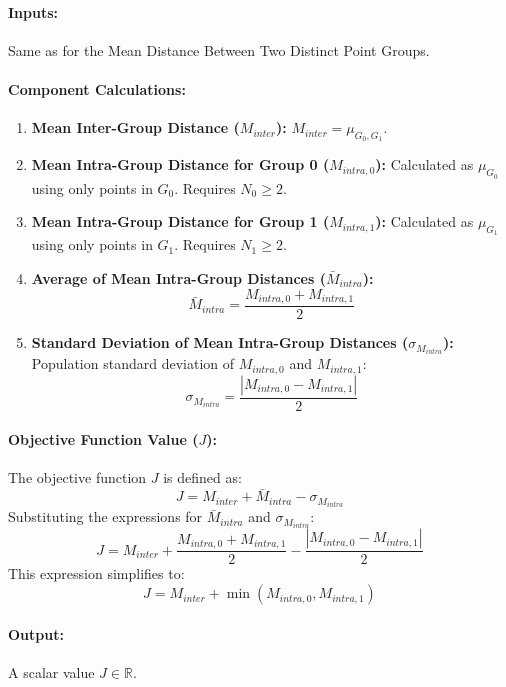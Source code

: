 \documentclass{article}
\begin{document}
\paragraph{Inputs:}
Same as for the Mean Distance Between Two Distinct Point Groups.

\paragraph{Component Calculations:}
\begin{enumerate}
    \item \textbf{Mean Inter-Group Distance ($M_{inter}$):}
    $M_{inter} = \mu_{G_0,G_1}$.

    \item \textbf{Mean Intra-Group Distance for Group 0 ($M_{intra,0}$):}
    Calculated as $\mu_{G_0}$ using only points in $G_0$. Requires $N_0 \ge 2$.

    \item \textbf{Mean Intra-Group Distance for Group 1 ($M_{intra,1}$):}
    Calculated as $\mu_{G_1}$ using only points in $G_1$. Requires $N_1 \ge 2$.

    \item \textbf{Average of Mean Intra-Group Distances ($\bar{M}_{intra}$):}
    $$ \bar{M}_{intra} = \frac{M_{intra,0} + M_{intra,1}}{2} $$

    \item \textbf{Standard Deviation of Mean Intra-Group Distances ($\sigma_{M_{intra}}$):}
    Population standard deviation of $M_{intra,0}$ and $M_{intra,1}$:
    $$ \sigma_{M_{intra}} = \frac{|M_{intra,0} - M_{intra,1}|}{2} $$
\end{enumerate}

\paragraph{Objective Function Value ($J$):}
The objective function $J$ is defined as:
$$ J = M_{inter} + \bar{M}_{intra} - \sigma_{M_{intra}} $$
Substituting the expressions for $\bar{M}_{intra}$ and $\sigma_{M_{intra}}$:
$$ J = M_{inter} + \frac{M_{intra,0} + M_{intra,1}}{2} - \frac{|M_{intra,0} - M_{intra,1}|}{2} $$
This expression simplifies to:
$$ J = M_{inter} + \min(M_{intra,0}, M_{intra,1}) $$

\paragraph{Output:}
A scalar value $J \in \mathbb{R}$.
\end{document}

